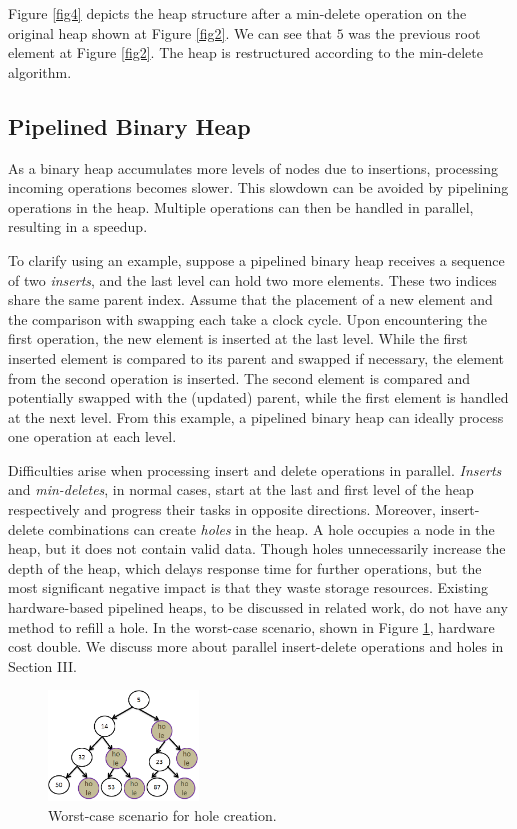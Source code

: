 \documentclass[10pt, conference, compsocconf]{IEEEtran}
\begin{document}
Figure \ref{fig4} depicts the heap structure after a min-delete operation on the original heap shown at Figure \ref{fig2}.
We can see that $5$ was the previous root element at Figure \ref{fig2}.
The heap is restructured according to the min-delete algorithm.

\subsection{Pipelined Binary Heap}
As a binary heap accumulates more levels of nodes due to insertions, processing incoming operations becomes slower.
This slowdown can be avoided by pipelining operations in the heap.
Multiple operations can then be handled in parallel, resulting in a speedup.

To clarify using an example, suppose a pipelined binary heap receives a sequence of two {\it inserts}, and the last level can hold two more elements.
These two indices share the same parent index.
Assume that the placement of a new element and the comparison with swapping each take a clock cycle.
Upon encountering the first operation, the new element is inserted at the last level.
While the first inserted element is compared to its parent and swapped if necessary, the element from the second operation is inserted.
The second element is compared and potentially swapped with the (updated) parent, while the first element is handled at the next level.
From this example, a pipelined binary heap can ideally process one operation at each level.

Difficulties arise when processing insert and delete operations in parallel.
{\it Inserts} and {\it min-deletes}, in normal cases, start at the last and first level of the heap respectively and progress their tasks in opposite directions.
Moreover, insert-delete combinations can create {\it holes} in the heap. 
A hole occupies a node in the heap, but it does not contain valid data.
Though holes unnecessarily increase the depth of the heap, which delays response time for further operations, but the most significant negative impact is that they waste storage resources.
Existing hardware-based pipelined heaps, to be discussed in related work, do not have any method to refill a hole.
In the worst-case scenario, shown in Figure \ref{hole}, hardware cost double. 
We discuss more about parallel insert-delete operations and holes in Section III.

\begin{figure}[!ht]
  \centering
  \includegraphics[width=4cm]{Figures/hole.png}
      \caption{Worst-case scenario for hole creation.}
    \label{hole}
\end{figure}
\end{document}
